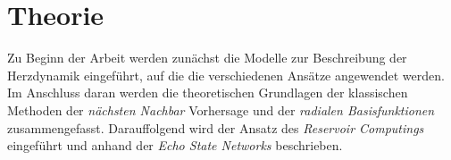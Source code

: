 \chapter{Theorie}
\label{ch:theory}
Zu Beginn der Arbeit werden zunächst die Modelle zur Beschreibung der Herzdynamik eingeführt, auf die die verschiedenen Ansätze angewendet werden. Im Anschluss daran werden die theoretischen Grundlagen der klassischen Methoden der \textit{nächsten Nachbar} Vorhersage und der \textit{radialen Basisfunktionen} zusammengefasst. Darauffolgend wird der Ansatz des \textit{Reservoir Computings} eingeführt und anhand der \textit{Echo State Networks} beschrieben.




